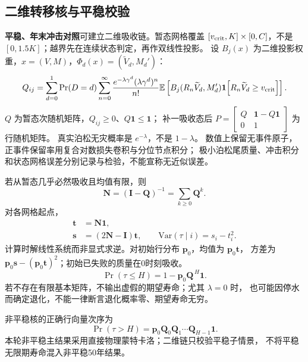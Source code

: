 \subsection{二维转移核与平稳校验}
\textbf{平稳、年末冲击对照}可建立二维吸收链。暂态网格覆盖
$[v_{\rm crit},K]\times[0,C]$，不是 $[0,1.5K]$；越界先在连续状态判定，再作双线性投影。
设 $B_j(x)$ 为二维投影权重，$x=(V,M)$，$\Phi_d(x)=(\widetilde V_d,M_d')$：
\begin{equation}\label{eq:P}
Q_{ij}=\sum_{d=0}^{1}\Pr(D=d)
\sum_{n=0}^{\infty}\frac{e^{-\lambda\gamma^d}(\lambda\gamma^d)^n}{n!}
\mathbb{E}\left[B_j(R_n\widetilde V_d,M_d')\mathbf{1}\!\left[R_n\widetilde V_d\ge v_{\rm crit}\right]\right].
\end{equation}
$Q$ 为暂态次随机矩阵，$Q_{ij}\ge0$、$Q\bm1\le\bm1$；
补一吸收态后 $P=\left[\begin{smallmatrix}Q&\bm1-Q\bm1\\0&1\end{smallmatrix}\right]$ 为行随机矩阵。
真实泊松无灾概率是 $e^{-\lambda}$，不是 $1-\lambda$。
数值上保留无事件原子，正事件保留率用复合对数损失卷积与分位节点积分；
极小泊松尾质量、冲击积分和状态网格误差分别记录与检验，不能宣称无近似误差。

若从暂态几乎必然吸收且均值有限，则
\begin{equation}\label{eq:N}
\bm N=(\bm I-\bm Q)^{-1}=\sum_{k\ge0}\bm Q^k.
\end{equation}
对各网格起点，
\begin{align}
\bm t&=\bm N\bm1,\label{eq:etime}\\
\bm s&=(2\bm N-\bm I)\bm t,\qquad
\mathrm{Var}(\tau\mid i)=s_i-t_i^2.\label{eq:var}
\end{align}
计算时解线性系统而非显式求逆。对初始行分布 $\bm p_0$，均值为 $\bm p_0\bm t$，
方差为 $\bm p_0\bm s-(\bm p_0\bm t)^2$；初始已失败的质量在0时刻吸收。
\begin{equation}\label{eq:ptau}
\Pr(\tau\le H)=1-\bm p_0\bm Q^{\,H}\bm1.
\end{equation}
若不存在有限基本矩阵，不输出虚假的期望寿命；尤其 $\lambda=0$ 时，
也可能因停水而确定退化，不能一律断言退化概率零、期望寿命无穷。

非平稳核的正确行向量次序为
\begin{equation}\label{eq:tv}
\Pr(\tau>H)=\bm p_0\bm Q_0\bm Q_1\cdots\bm Q_{H-1}\bm1.
\end{equation}
本轮非平稳主结果采用直接物理蒙特卡洛；二维链只校验平稳子情景，
不将平稳无限期寿命混入非平稳50年结果。

